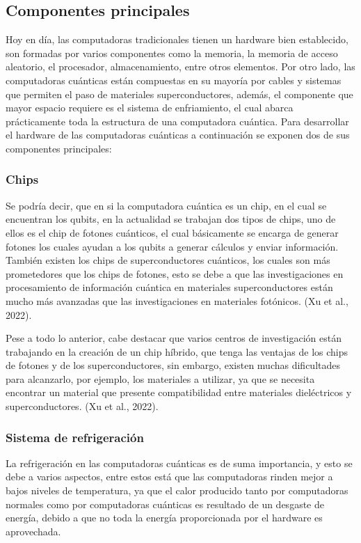 \documentclass[twoside]{article}
\begin{document}
\subsection{Componentes principales}
Hoy en día, las computadoras tradicionales tienen un hardware bien establecido, son formadas por varios componentes como la memoria, la memoria de acceso aleatorio, el procesador, almacenamiento, entre otros elementos.
Por otro lado, las computadoras cuánticas están compuestas en su mayoría por cables y sistemas que permiten el paso de materiales superconductores, además, el componente que mayor espacio requiere es el sistema de enfriamiento, el cual abarca prácticamente toda la estructura de una computadora cuántica. Para desarrollar el hardware de las computadoras cuánticas a continuación se exponen dos de sus componentes principales:

\subsubsection{Chips}
Se podría decir, que en si la computadora cuántica es un chip, en el cual se encuentran los qubits, en la actualidad se trabajan dos tipos de chips, uno de ellos es el chip de fotones cuánticos, el cual básicamente se encarga de generar fotones los cuales ayudan a los qubits a generar cálculos y enviar información. También existen los chips de superconductores cuánticos, los cuales son más prometedores que los chips de fotones, esto se debe a que las investigaciones en procesamiento de información cuántica en materiales superconductores están mucho más avanzadas que las investigaciones en materiales fotónicos. (Xu et al., 2022).

Pese a todo lo anterior, cabe destacar que varios centros de investigación están trabajando en la creación de un chip híbrido, que tenga las ventajas de los chips de fotones y de los superconductores, sin embargo, existen muchas dificultades para alcanzarlo, por ejemplo, los materiales a utilizar, ya que se necesita encontrar un material que presente compatibilidad entre materiales dieléctricos y superconductores. (Xu et al., 2022).

\subsubsection{Sistema de refrigeración}
La refrigeración en las computadoras cuánticas es de suma importancia, y esto se debe a varios aspectos, entre estos está que las computadoras rinden mejor a bajos niveles de temperatura, ya que el calor producido tanto por computadoras normales como por computadoras cuánticas es resultado de un desgaste de energía, debido a que no toda la energía proporcionada por el hardware es aprovechada.
 
\end{document}
